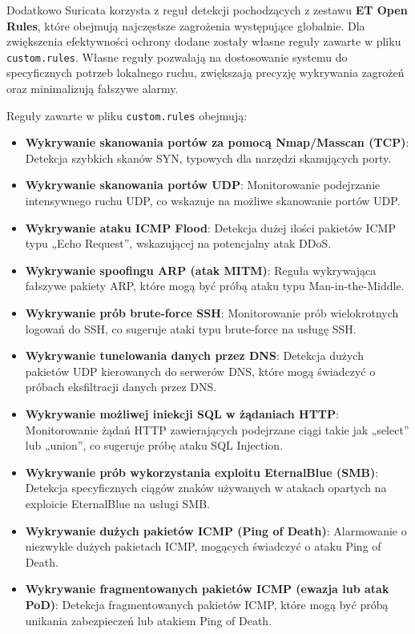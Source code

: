 \documentclass[
    left=2.5cm,         %
    right=2.5cm,        %
    top=2.5cm,          %
    bottom=3cm,         %
    bindingoffset=6mm,  %
    nohyphenation=true %
]{eiti/eiti-thesis} %
\begin{document}
Dodatkowo Suricata korzysta z reguł detekcji pochodzących z zestawu \textbf{ET Open Rules}, które obejmują najczęstsze zagrożenia występujące globalnie. Dla zwiększenia efektywności ochrony  dodane zostały własne reguły zawarte w pliku \texttt{custom.rules}\cite{custom-rules-github}. Własne reguły pozwalają na dostosowanie systemu do specyficznych potrzeb lokalnego ruchu, zwiększają precyzję wykrywania zagrożeń oraz minimalizują fałszywe alarmy.

\newpage
Reguły zawarte w pliku \texttt{custom.rules} obejmują:

\begin{itemize}
\item \textbf{Wykrywanie skanowania portów za pomocą Nmap/Masscan (TCP)}: Detekcja szybkich skanów SYN, typowych dla narzędzi skanujących porty.
\item \textbf{Wykrywanie skanowania portów UDP}: Monitorowanie podejrzanie intensywnego ruchu UDP, co wskazuje na możliwe skanowanie portów UDP.

\item \textbf{Wykrywanie ataku ICMP Flood}: Detekcja dużej ilości pakietów ICMP typu „Echo Request”, wskazującej na potencjalny atak DDoS.

\item \textbf{Wykrywanie spoofingu ARP (atak MITM)}: Reguła wykrywająca fałszywe pakiety ARP, które mogą być próbą ataku typu Man-in-the-Middle.

\item \textbf{Wykrywanie prób brute-force SSH}: Monitorowanie prób wielokrotnych logowań do SSH, co sugeruje ataki typu brute-force na usługę SSH.

\item \textbf{Wykrywanie tunelowania danych przez DNS}: Detekcja dużych pakietów UDP kierowanych do serwerów DNS, które mogą świadczyć o próbach eksfiltracji danych przez DNS.

\item \textbf{Wykrywanie możliwej iniekcji SQL w żądaniach HTTP}: Monitorowanie żądań HTTP zawierających podejrzane ciągi takie jak „select” lub „union”, co sugeruje próbę ataku SQL Injection.

\item \textbf{Wykrywanie prób wykorzystania exploitu EternalBlue (SMB)}: Detekcja specyficznych ciągów znaków używanych w atakach opartych na exploicie EternalBlue na usługi SMB.

\item \textbf{Wykrywanie dużych pakietów ICMP (Ping of Death)}: Alarmowanie o niezwykle dużych pakietach ICMP, mogących świadczyć o ataku Ping of Death.

\item \textbf{Wykrywanie fragmentowanych pakietów ICMP (ewazja lub atak PoD)}: Detekcja fragmentowanych pakietów ICMP, które mogą być próbą unikania zabezpieczeń lub atakiem Ping of Death.
\end{itemize}
\end{document}
